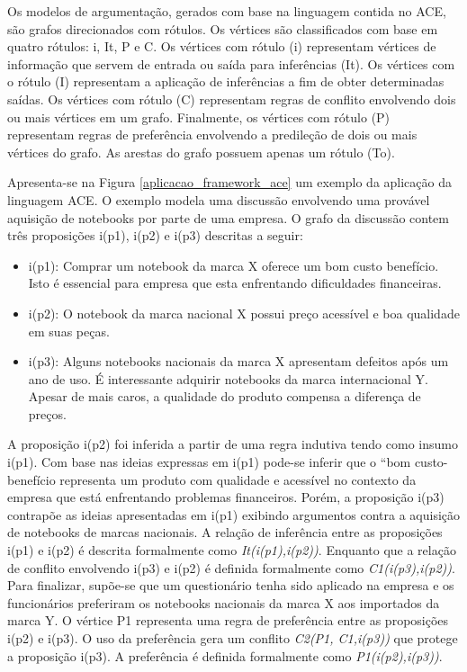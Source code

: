 Os modelos de argumentação, gerados com base na linguagem contida no ACE, são grafos direcionados com rótulos.  Os vértices são classificados com base em quatro rótulos: i, It, P e C. Os vértices com rótulo (i) representam vértices de informação que servem de entrada ou saída para inferências (It). Os vértices com o rótulo (I) representam a aplicação de inferências a fim de obter determinadas saídas. Os vértices com rótulo (C) representam regras de conflito envolvendo dois ou mais vértices em um grafo. Finalmente, os vértices com rótulo (P) representam regras de preferência envolvendo a predileção de dois ou mais vértices do grafo. As arestas do grafo possuem apenas um rótulo (To).

Apresenta-se na Figura \ref{aplicacao_framework_ace} um exemplo da aplicação da linguagem ACE. O exemplo modela uma discussão envolvendo uma provável aquisição de notebooks por parte de uma empresa. O grafo da discussão contem três proposições i(p1), i(p2) e i(p3) descritas a seguir:

\begin{itemize}

\item i(p1): Comprar um notebook da marca X oferece um bom custo benefício. Isto é essencial para empresa que esta enfrentando dificuldades financeiras.

\item i(p2): O notebook da marca nacional X possui preço acessível e boa qualidade em suas peças.

\item i(p3): Alguns notebooks nacionais da marca X apresentam defeitos após um ano de uso. É interessante adquirir notebooks da marca internacional Y. Apesar de mais caros, a qualidade do produto compensa a diferença de preços.

\end{itemize}

A proposição i(p2) foi inferida a partir de uma regra indutiva tendo como insumo i(p1). Com base nas ideias expressas em i(p1) pode-se inferir que o “bom custo-benefício representa um produto com qualidade e acessível no contexto da empresa que está enfrentando problemas financeiros. Porém,  a  proposição i(p3) contrapõe as ideias apresentadas em i(p1) exibindo argumentos contra a aquisição de notebooks de marcas nacionais. A relação de inferência entre as proposições i(p1) e i(p2) é descrita formalmente como \textit{It(i(p1),i(p2))}. Enquanto que a relação de conflito envolvendo i(p3) e i(p2) é definida formalmente como \textit{C1(i(p3),i(p2))}. Para finalizar, supõe-se que um questionário tenha sido aplicado na empresa e os funcionários preferiram os notebooks nacionais da marca X aos importados da marca Y. O vértice P1 representa uma regra de preferência entre as proposições i(p2) e i(p3). O uso da preferência gera um conflito \textit{C2(P1, {C1,i(p3)})} que protege a proposição i(p3). A preferência é definida formalmente como \textit{P1(i(p2),i(p3))}.

